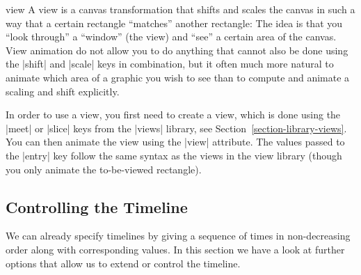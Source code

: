 \begin{tikzanimateattribute}{view}
    A view is a canvas transformation that shifts and scales the canvas in such
    a way that a certain rectangle ``matches'' another rectangle: The idea is
    that you ``look through'' a ``window'' (the view) and ``see'' a certain
    area of the canvas. View animation do not allow you to do anything that
    cannot also be done using the |shift| and |scale| keys in combination, but
    it often much more natural to animate which area of a graphic you wish to
    see than to compute and animate a scaling and shift explicitly.

    In order to use a view, you first need to create a view, which is done
    using the |meet| or |slice| keys from the |views| library, see
    Section~\ref{section-library-views}. You can then animate the view using
    the |view| attribute. The values passed to the |entry| key follow the same
    syntax as the views in the view library (though you only animate the
    to-be-viewed rectangle).
\begin{codeexample}[
    preamble={\usetikzlibrary{animations,views}},
    animation list={0.5,1,1.5,2},
    animation bb={(1.1,-0.9) rectangle (2.9,0.9)},
]
\end{codeexample}
\end{tikzanimateattribute}


\subsection{Controlling the Timeline}
\label{section-anim-timeline}

We can already specify timelines by giving a sequence of times in
non-decreasing order along with corresponding values. In this section we have a
look at further options that allow us to extend or control the timeline.


